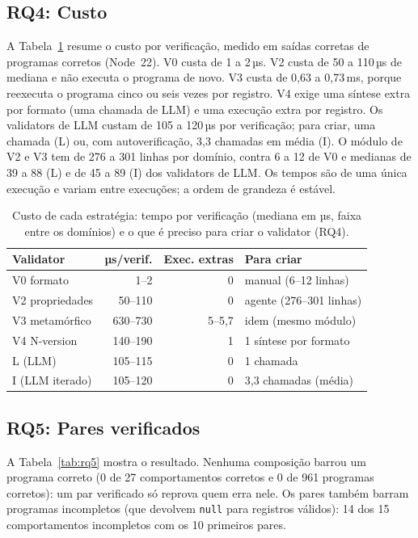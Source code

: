 \documentclass[sigconf,nonacm]{acmart}
\begin{document}
\subsection{RQ4: Custo}

A Tabela~\ref{tab:rq4} resume o custo por verificação, medido em saídas corretas de programas corretos (Node~22). V0 custa de 1 a 2\,µs. V2 custa de 50 a 110\,µs de mediana e não executa o programa de novo. V3 custa de 0,63 a 0,73\,ms, porque reexecuta o programa cinco ou seis vezes por registro. V4 exige uma síntese extra por formato (uma chamada de LLM) e uma execução extra por registro. Os validators de LLM custam de 105 a 120\,µs por verificação; para criar, uma chamada (L) ou, com autoverificação, 3,3 chamadas em média (I). O módulo de V2 e V3 tem de 276 a 301 linhas por domínio, contra 6 a 12 de V0 e medianas de 39 a 88 (L) e de 45 a 89 (I) dos validators de LLM. Os tempos são de uma única execução e variam entre execuções; a ordem de grandeza é estável.

\begin{table}[t]
\caption{Custo de cada estratégia: tempo por verificação (mediana em µs, faixa entre os domínios) e o que é preciso para criar o validator (RQ4).}
\label{tab:rq4}
\small
\begin{tabular}{lrrl}
\toprule
Validator & µs/verif. & Exec. extras & Para criar \\
\midrule
V0 formato & 1--2 & 0 & manual (6--12 linhas) \\
V2 propriedades & 50--110 & 0 & agente (276--301 linhas) \\
V3 metamórfico & 630--730 & 5--5,7 & idem (mesmo módulo) \\
V4 N-version & 140--190 & 1 & 1 síntese por formato \\
L (LLM) & 105--115 & 0 & 1 chamada \\
I (LLM iterado) & 105--120 & 0 & 3,3 chamadas (média) \\
\bottomrule
\end{tabular}
\end{table}

\subsection{RQ5: Pares verificados}
\label{sec:rq5}

A Tabela~\ref{tab:rq5} mostra o resultado. Nenhuma composição barrou um programa correto (0 de 27 comportamentos corretos e 0 de 961 programas corretos): um par verificado só reprova quem erra nele. Os pares também barram programas incompletos (que devolvem \texttt{null} para registros válidos): 14 dos 15 comportamentos incompletos com os 10 primeiros pares.
\end{document}
